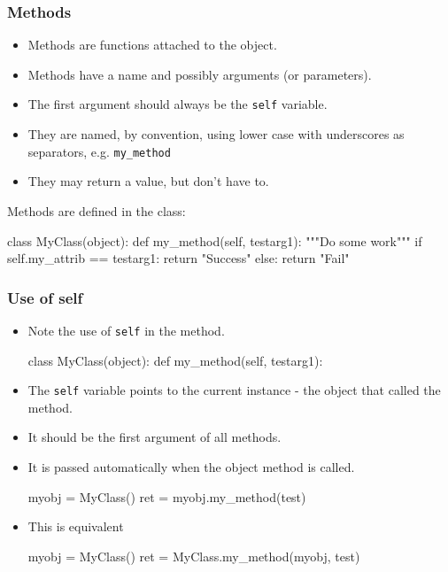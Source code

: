 \documentclass{beamer}
\begin{document}
\begin{frame}[fragile]
\frametitle{Methods}
\begin{itemize}
\item Methods are functions attached to the object.
\item Methods have a name and possibly arguments (or parameters).
\item The first argument should always be the \lstinline|self| variable.
\item They are named, by convention, using lower case with underscores as separators, 
e.g. \lstinline|my_method|
\item They may return a value, but don't have to.
\end{itemize}
\pause
Methods are defined in the class:
\begin{code}
class MyClass(object):
  def my_method(self, testarg1):
    """Do some work"""
    if self.my_attrib == testarg1:
    	return "Success"
    else:
    	return "Fail"
\end{code}

\end{frame}

\begin{frame}[fragile]
\frametitle{Use of self}
\begin{itemize}
\item Note the use of \lstinline|self| in the method.
\begin{code}
class MyClass(object):
  def my_method(self, testarg1):
\end{code}
\item The \lstinline|self| variable points to the current instance - 
the object that called the method.
\item It should be the first argument of all methods.
\pause
\item It is passed automatically when the object method is called.
\begin{code}
myobj = MyClass()
ret = myobj.my_method(test)
\end{code}
\pause
\item This is equivalent
\begin{code}
myobj = MyClass()
ret = MyClass.my_method(myobj, test)
\end{code}
\end{itemize}

\end{frame}
\end{document}
